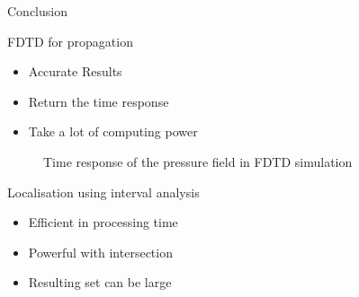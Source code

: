 \documentclass[9pt, xcolor={usenames, dvipsnames}]{beamer}
\begin{document}
			\begin{frame}{Conclusion}
				\centering
				\begin{minipage}{0.46\textwidth}
					\begin{block}{FDTD for propagation}
						\begin{itemize}
							\item Accurate Results
							\item Return the time response
							\item Take a lot of computing power
						\end{itemize}
					\end{block}
					\begin{figure}
						\caption{Time response of the pressure field in FDTD simulation}
					\end{figure}
				\end{minipage}
				\hfill
				\begin{minipage}{0.46\textwidth}
					\begin{block}{Localisation using interval analysis}
						\begin{itemize}
							\item Efficient in processing time
							\item Powerful with intersection
							\item Resulting set can be large
						\end{itemize}
					\end{block}
					\begin{figure}

\end{figure}
\end{minipage}
\end{frame}
\end{document}
